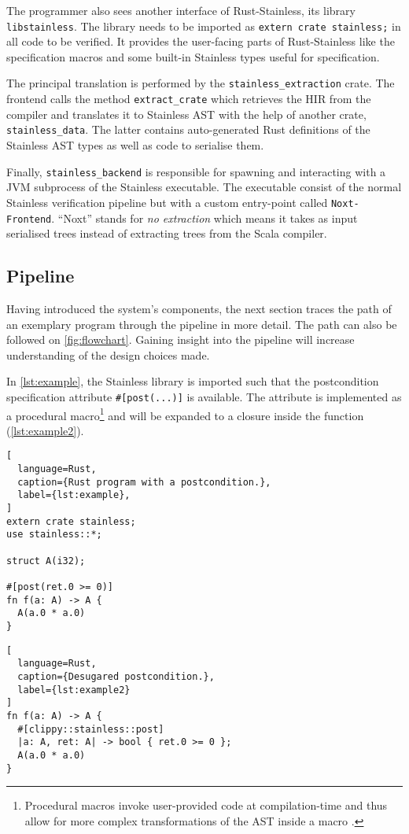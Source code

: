 The programmer also sees another interface of Rust-Stainless, its library
\lstinline!libstainless!. The library needs to be imported as
\passthrough{\lstinline!extern crate stainless;!} in all code to be verified. It
provides the user-facing parts of Rust-Stainless like the specification macros
and some built-in Stainless types useful for specification.

The principal translation is performed by the \lstinline!stainless_extraction!
crate. The frontend calls the method \lstinline!extract_crate! which retrieves
the HIR from the compiler and translates it to Stainless AST with the help of
another crate, \lstinline!stainless_data!. The latter contains auto-generated
Rust definitions of the Stainless AST types as well as code to serialise them.

Finally, \lstinline!stainless_backend! is responsible for spawning and
interacting with a JVM subprocess of the Stainless executable. The executable
consist of the normal Stainless verification pipeline but with a custom
entry-point called \lstinline!Noxt-Frontend!. ``Noxt'' stands for \emph{no
extraction} which means it takes as input serialised trees instead of extracting
trees from the Scala compiler.

\subsection{Pipeline}
\label{sec:pipeline}

Having introduced the system's components, the next section traces the path of
an exemplary program through the pipeline in more detail. The path can also be
followed on \autoref{fig:flowchart}. Gaining insight into the pipeline will
increase understanding of the design choices made.

In \autoref{lst:example}, the Stainless library is imported such that the
postcondition specification attribute \lstinline!#[post(...)]! is available.
The attribute is implemented as a procedural macro\footnote{Procedural macros
invoke user-provided code at compilation-time and thus allow for more complex
transformations of the AST inside a macro \cite[section ``Procedural
Macros'']{rustref}.} and will be expanded to a closure inside the function
(\autoref{lst:example2}).

\noindent\begin{minipage}[b]{.43\textwidth}
\begin{lstlisting}[
  language=Rust,
  caption={Rust program with a postcondition.},
  label={lst:example},
]
extern crate stainless;
use stainless::*;

struct A(i32);

#[post(ret.0 >= 0)]
fn f(a: A) -> A {
  A(a.0 * a.0)
}
\end{lstlisting}
\end{minipage}\hfill
\begin{minipage}[b]{.54\textwidth}
\begin{lstlisting}[
  language=Rust,
  caption={Desugared postcondition.},
  label={lst:example2}
]
fn f(a: A) -> A {
  #[clippy::stainless::post]
  |a: A, ret: A| -> bool { ret.0 >= 0 };
  A(a.0 * a.0)
}
\end{lstlisting}
\end{minipage}

